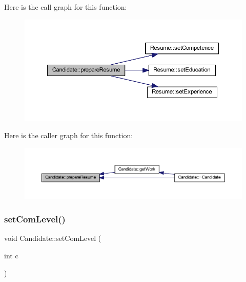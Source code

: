 Here is the call graph for this function\+:
\nopagebreak
\begin{figure}[H]
\begin{center}
\leavevmode
\includegraphics[width=350pt]{class_candidate_afee91575da03a495aad2f45f84ae341c_cgraph}
\end{center}
\end{figure}
Here is the caller graph for this function\+:
\nopagebreak
\begin{figure}[H]
\begin{center}
\leavevmode
\includegraphics[width=350pt]{class_candidate_afee91575da03a495aad2f45f84ae341c_icgraph}
\end{center}
\end{figure}
\hypertarget{class_candidate_a936a7347b368ef38d994d4aecf4cee0c}{}\label{class_candidate_a936a7347b368ef38d994d4aecf4cee0c} 
\subsubsection{\texorpdfstring{set\+Com\+Level()}{setComLevel()}}
{\footnotesize\ttfamily void Candidate\+::set\+Com\+Level (\begin{DoxyParamCaption}\item[{int}]{c }\end{DoxyParamCaption})\hspace{0.3cm}{\ttfamily [inline]}}

\hypertarget{class_candidate_a1fcf329a8244281d0ab8dd4100fc2c41}{}\label{class_candidate_a1fcf329a8244281d0ab8dd4100fc2c41} 
